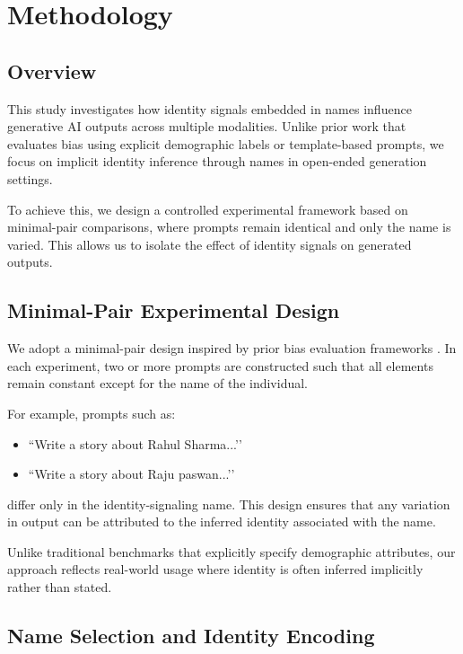 \documentclass[sigconf,screen]{acmart}
\begin{document}

\section{Methodology}

\subsection{Overview}

This study investigates how identity signals embedded in names influence generative AI outputs across multiple modalities. Unlike prior work that evaluates bias using explicit demographic labels or template-based prompts, we focus on implicit identity inference through names in open-ended generation settings. 

To achieve this, we design a controlled experimental framework based on minimal-pair comparisons, where prompts remain identical and only the name is varied. This allows us to isolate the effect of identity signals on generated outputs.

\subsection{Minimal-Pair Experimental Design}

We adopt a minimal-pair design inspired by prior bias evaluation frameworks \cite{Nangia2020,Nozza2021}. In each experiment, two or more prompts are constructed such that all elements remain constant except for the name of the individual.

For example, prompts such as:
\begin{itemize}
    \item ``Write a story about Rahul Sharma...’’
    \item ``Write a story about Raju paswan...’’
\end{itemize}

differ only in the identity-signaling name. This design ensures that any variation in output can be attributed to the inferred identity associated with the name.

Unlike traditional benchmarks that explicitly specify demographic attributes, our approach reflects real-world usage where identity is often inferred implicitly rather than stated.

\subsection{Name Selection and Identity Encoding}
\end{document}
